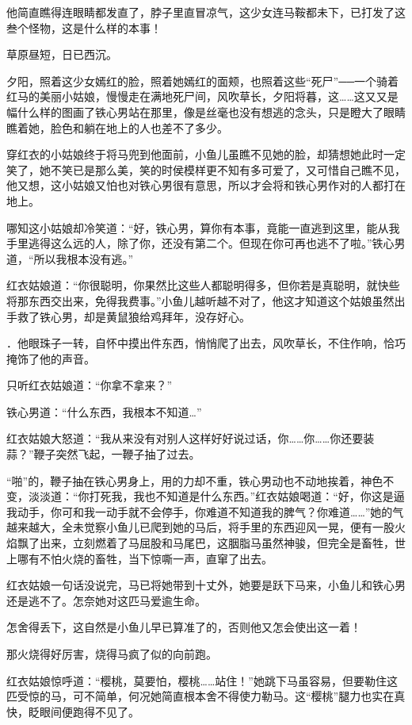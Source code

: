 \documentclass[12pt,oneside]{book}
\begin{document}
他简直瞧得连眼睛都发直了，脖子里直冒凉气，这少女连马鞍都未下，已打发了这叁个怪物，这是什么样的本事！

草原昼短，日已西沉。

夕阳，照着这少女嫣红的脸，照着她嫣红的面颊，也照着这些``死尸''──一个骑着红马的美丽小姑娘，慢慢走在满地死尸间，风吹草长，夕阳将暮，这\ldots\ldots 这又又是幅什么样的图画了铁心男站在那里，像是丝毫也没有想逃的念头，只是瞪大了眼睛瞧着她，脸色和躺在地上的人也差不了多少。

穿红衣的小姑娘终于将马兜到他面前，小鱼儿虽瞧不见她的脸，却猜想她此时一定笑了，她不笑已是那么美，笑的时侯模样更不知有多可爱了，又可惜自己瞧不见，他又想，这小姑娘又怕也对铁心男很有意思，所以才会将和铁心男作对的人都打在地上。

哪知这小姑娘却冷笑道：``好，铁心男，算你有本事，竟能一直逃到这里，能从我手里逃得这么远的人，除了你，还没有第二个。但现在你可再也逃不了啦。''铁心男道，``所以我根本没有逃。''

红衣姑娘道：``你很聪明，你果然比这些人都聪明得多，但你若是真聪明，就快些将那东西交出来，免得我费事。''小鱼儿越听越不对了，他这才知道这个姑娘虽然出手救了铁心男，却是黄鼠狼给鸡拜年，没存好心。

．他眼珠子一转，自怀中摸出件东西，悄悄爬了出去，风吹草长，不住作响，恰巧掩饰了他的声音。

只听红衣姑娘道：``你拿不拿来？''

铁心男道：``什么东西，我根本不知道\ldots{}''

红衣姑娘大怒道：``我从来没有对别人这样好好说过话，你\ldots\ldots 你\ldots\ldots 你还要装蒜？''鞭子突然飞起，一鞭子抽了过去。

``啪''的，鞭子抽在铁心男身上，用的力却不重，铁心男动也不动地挨着，神色不变，淡淡道：``你打死我，我也不知道是什么东西。''红衣姑娘喝道：``好，你这是逼我动手，你可和我一动手就不会停手，你难道不知道我的脾气？你难道\ldots\ldots{}''她的气越来越大，全未觉察小鱼儿已爬到她的马后，将手里的东西迎风一晃，便有一股火焰飘了出来，立刻燃着了马屈股和马尾巴，这胭脂马虽然神骏，但完全是畜牲，世上哪有不怕火烧的畜牲，当下惊嘶一声，直窜了出去。

红衣姑娘一句话没说完，马已将她带到十丈外，她要是跃下马来，小鱼儿和铁心男还是逃不了。怎奈她对这匹马爱逾生命。

怎舍得丢下，这自然是小鱼儿早已算准了的，否则他又怎会使出这一着！

那火烧得好厉害，烧得马疯了似的向前跑。

红衣姑娘惊呼道：``樱桃，莫要怕，樱桃\ldots\ldots 站住！''她跳下马虽容易，但要勒住这匹受惊的马，可不简单，何况她简直根本舍不得使力勒马。这``樱桃''腿力也实在真快，眨眼间便跑得不见了。
\end{document}
